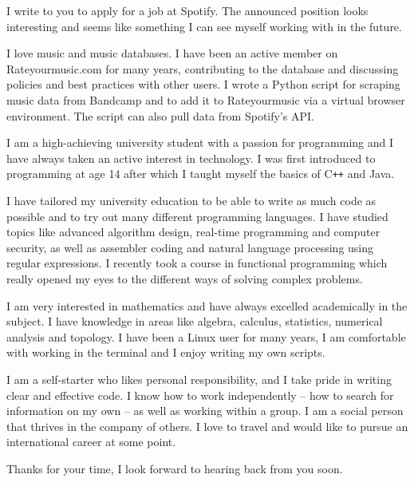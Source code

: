 I write to you to apply for a job at Spotify. The announced position looks interesting and seems like something I can see myself working with in the future.

I love music and music databases. I have been an active member on Rateyourmusic.com for many years, contributing to the database and discussing policies and best practices with other users. I wrote a Python script for scraping music data from Bandcamp and to add it to Rateyourmusic via a virtual browser environment. The script can also pull data from Spotify's API.

I am a high-achieving university student with a passion for programming and I have always taken an active interest in technology. I was first introduced to programming at age 14 after which I taught myself the basics of C\texttt{++} and Java.

I have tailored my university education to be able to write as much code as possible and to try out many different programming languages. I have studied topics like advanced algorithm design, real-time programming and computer security, as well as assembler coding and natural language processing using regular expressions. I recently took a course in functional programming which really opened my eyes to the different ways of solving complex problems.

I am very interested in mathematics and have always excelled academically in the subject. I have knowledge in areas like algebra, calculus, statistics, numerical analysis and topology. I have been a Linux user for many years, I am comfortable with working in the terminal and I enjoy writing my own scripts.

I am a self-starter who likes personal responsibility, and I take pride in writing clear and effective code. I know how to work independently – how to search for information on my own – as well as working within a group. I am a social person that thrives in the company of others. I love to travel and would like to pursue an international career at some point.

Thanks for your time, I look forward to hearing back from you soon.
